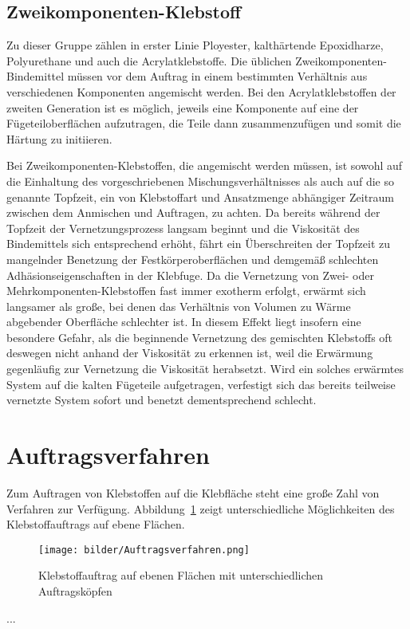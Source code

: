 \subsection{Zweikomponenten-Klebstoff}
Zu dieser Gruppe zählen in erster Linie Ployester, kalthärtende Epoxidharze, Polyurethane und auch die Acrylatklebstoffe. Die üblichen Zweikomponenten-Bindemittel müssen vor dem Auftrag in einem bestimmten Verhältnis aus verschiedenen Komponenten angemischt werden. Bei den Acrylatklebstoffen der zweiten Generation ist es möglich, jeweils eine Komponente auf eine der Fügeteiloberflächen aufzutragen, die Teile dann zusammenzufügen und somit die Härtung zu initiieren.

Bei Zweikomponenten-Klebstoffen, die angemischt werden müssen, ist sowohl auf die Einhaltung des vorgeschriebenen Mischungsverhältnisses als auch auf die so genannte Topfzeit, ein von Klebstoffart und Ansatzmenge abhängiger Zeitraum zwischen dem Anmischen und Auftragen, zu achten. Da bereits während der Topfzeit der Vernetzungsprozess langsam beginnt und die Viskosität des Bindemittels sich entsprechend erhöht, fährt ein Überschreiten der Topfzeit zu mangelnder Benetzung der Festkörperoberflächen und demgemäß schlechten Adhäsionseigenschaften in der Klebfuge. Da die Vernetzung von Zwei- oder Mehrkomponenten-Klebstoffen fast immer exotherm erfolgt, erwärmt sich langsamer als große, bei denen das Verhältnis von Volumen zu Wärme abgebender Oberfläche schlechter ist. In diesem Effekt liegt insofern eine besondere Gefahr, als die beginnende Vernetzung des gemischten Klebstoffs oft deswegen nicht anhand der Viskosität zu erkennen ist, weil die Erwärmung gegenläufig zur Vernetzung die Viskosität herabsetzt. Wird ein solches erwärmtes System auf die kalten Fügeteile aufgetragen, verfestigt sich das bereits teilweise vernetzte System sofort und benetzt dementsprechend schlecht.


\section{Auftragsverfahren}
Zum Auftragen von Klebstoffen auf die Klebfläche steht eine große Zahl von Verfahren zur Verfügung. Abbildung~\ref{fig:Auftragsverfahren} zeigt unterschiedliche Möglichkeiten des Klebstoffauftrags auf ebene Flächen.
\begin{figure}[H]
\begin{center}
\texttt{[image: bilder/Auftragsverfahren.png]}
\caption{Klebstoffauftrag auf ebenen Flächen mit
unterschiedlichen Auftragsköpfen}
\label{fig:Auftragsverfahren}
\end{center}
\end{figure}
...


